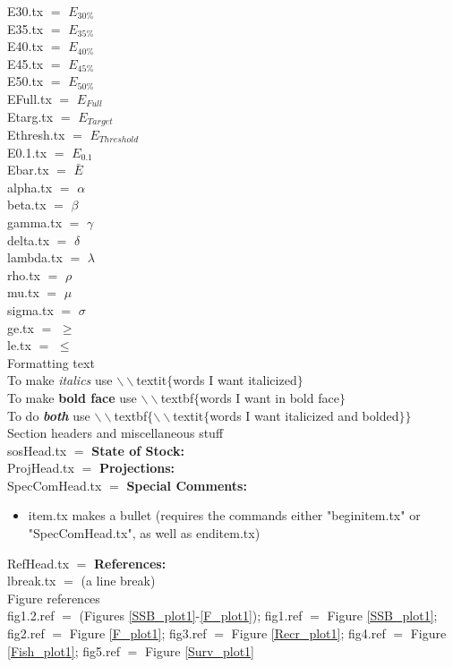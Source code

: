 \documentclass[]{report}
\begin{document}
  E30.tx $=$ $E_{30\%}$ \\
  E35.tx $=$ $E_{35\%}$  \\
  E40.tx $=$ $E_{40\%}$  \\
  E45.tx $=$ $E_{45\%}$  \\
  E50.tx $=$ $E_{50\%}$    \\
  EFull.tx $=$ $E_{Full}$ \\
  Etarg.tx $=$ $E_{Target}$ \\ 
  Ethresh.tx $=$ $E_{Threshold}$ \\ 
  E0.1.tx $=$ $E_{0.1}$    \\
  Ebar.tx $=$ $\bar{E}$   \\  
  alpha.tx $=$ $\alpha$    \\
  beta.tx $=$ $\beta$    \\  
  gamma.tx $=$ $\gamma$    \\
  delta.tx $=$ $\delta$    \\
  lambda.tx $=$ $\lambda$    \\  
  rho.tx $=$ $\rho$    \\
  mu.tx $=$ $\mu$    \\	  
  sigma.tx $=$ $\sigma$    \\
  ge.tx $=$ $\geq$    \\
  le.tx $=$ $\leq$    \\
    
  \vspace{1cm}  
  Formatting text \\
  To make \textit{italics} use $\backslash\backslash$textit$\lbrace$words I want italicized$\rbrace$\\
  To make \textbf{bold face} use $\backslash\backslash$textbf$\lbrace$words I want in bold face$\rbrace$\\
  To do \textbf{\textit{both}}	use $\backslash\backslash$textbf$\lbrace\backslash\backslash$textit$\lbrace$words I want italicized and bolded$\rbrace\rbrace$\\  
  
  
  \vspace{1cm}
  Section headers and miscellaneous stuff 
	\\  
  sosHead.tx $=$ \textbf{State of Stock:} \\  
  ProjHead.tx $=$ \textbf{Projections:}   \\
  SpecComHead.tx $=$ \textbf{Special Comments:} \begin{itemize}   
   \item item.tx makes a bullet (requires the commands either "beginitem.tx" or "SpecComHead.tx", as well as enditem.tx) \end{itemize}  
  RefHead.tx $=$ \textbf{References:} \\
  lbreak.tx $=$ \linebreak  (a line break) \\
\vspace{1cm} 
  Figure references
  \\
  fig1.2.ref $=$ (Figures \ref{SSB_plot1}-\ref{F_plot1});
  fig1.ref $=$ Figure \ref{SSB_plot1};
  fig2.ref $=$ Figure \ref{F_plot1}; 	
  fig3.ref $=$ Figure \ref{Recr_plot1};	   
  fig4.ref $=$ Figure \ref{Fish_plot1}; 	
  fig5.ref $=$ Figure \ref{Surv_plot1}
\clearpage
\end{document}
